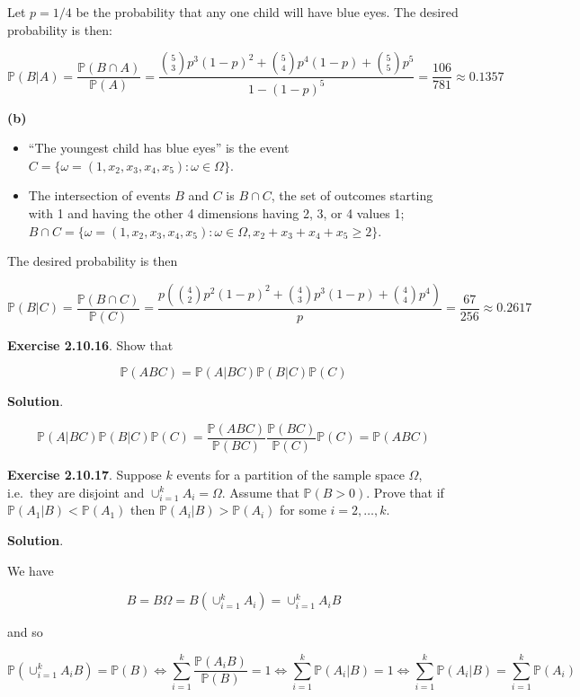 Let \(p = 1/4\) be the probability that any one child will have blue eyes.
The desired probability is then:

\[\mathbb{P}(B | A) = \frac{\mathbb{P}(B \cap A)}{\mathbb{P}(A)} = \frac{
\binom{5}{3} p^{3} (1 - p)^{2} + \binom{5}{4} p^{4} (1 - p) + \binom{5}{5} p^{5}
}{1 - \left(1 - p \right)^{5}} = \frac{106}{781} \approx 0.1357 \]

\textbf{(b)}

\begin{itemize}[tightlist]
\item
  ``The youngest child has blue eyes'' is the event
  \(C = \{ \omega = (1, x_{2}, x_{3}, x_{4}, x_{5}) : \omega \in \Omega \}\).
\item
  The intersection of events \(B\) and \(C\) is \(B \cap C\), the set of
  outcomes starting with 1 and having the other 4 dimensions having 2,
  3, or 4 values 1;
  \(B \cap C = \{ \omega = (1, x_{2}, x_{3}, x_{4}, x_{5}) : \omega \in \Omega, x_{2} + x_{3} + x_{4} + x_{5} \geq 2 \}\).
\end{itemize}

The desired probability is then

\[ \mathbb{P}(B | C) = \frac{\mathbb{P}(B \cap C)}{\mathbb{P}(C)} = \frac{p \left(\binom{4}{2} p^{2} (1-p)^{2} + \binom{4}{3} p^{3} (1 - p) + \binom{4}{4} p^{4} \right)}{ p } = \frac{67}{256} \approx 0.2617 \]

\textbf{Exercise 2.10.16}. Show that

\[  \mathbb{P}(ABC) = \mathbb{P}(A | BC) \mathbb{P}(B | C) \mathbb{P}(C) \]

\textbf{Solution}.

\[ \mathbb{P}(A | BC) \mathbb{P}(B | C) \mathbb{P}(C) = \frac{\mathbb{P}(ABC)}{\mathbb{P}(BC)}  \frac{\mathbb{P}(BC)}{\mathbb{P}(C)} \mathbb{P}(C) = \mathbb{P}(ABC) \]

\textbf{Exercise 2.10.17}. Suppose \(k\) events for a partition of the
sample space \(\Omega\), i.e.~they are disjoint and
\(\cup_{i=1}^{k} A_{i} = \Omega\). Assume that \(\mathbb{P}(B > 0)\). Prove
that if \(\mathbb{P}(A_{1} | B) < \mathbb{P}(A_{1})\) then
\(\mathbb{P}(A_{i} | B) > \mathbb{P}(A_{i})\) for some \(i = 2, \dots, k\).

\textbf{Solution}.

We have

\[ B = B\Omega = B \left( \cup_{i=1}^{k} A_{i} \right) = \cup_{i=1}^{k} A_{i} B \]

and so

\[ \mathbb{P}\left( \cup_{i=1}^{k} A_{i} B \right) = \mathbb{P}(B) 
\Longleftrightarrow \sum_{i=1}^{k} \frac{\mathbb{P}(A_{i} B)}{\mathbb{P}(B)} = 1
\Longleftrightarrow \sum_{i=1}^{k} \mathbb{P}(A_{i} | B) = 1
\Longleftrightarrow \sum_{i=1}^{k} \mathbb{P}(A_{i} | B) = \sum_{i=1}^{k} \mathbb{P}(A_{i})
\]

